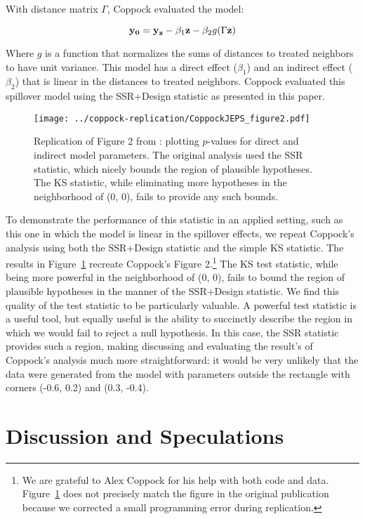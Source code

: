 With distance matrix $\Gamma$, Coppock evaluated the model:

$$\mathbf{y}_{\mathbf{0}} = \mathbf{y}_{\mathbf{z}} - \beta_1 \mathbf{z} - \beta_2 g(\Gamma \mathbf{z})$$

Where $g$ is a function that normalizes the sums of distances to treated
neighbors to have unit variance. This model has a direct
effect ($\beta_1$) and an indirect effect ($\beta_2$) that is linear in the distances to
treated neighbors. Coppock evaluated this spillover model using the SSR+Design statistic as
presented in this paper.

\begin{figure}[H] \centering
  \texttt{[image: ../coppock-replication/CoppockJEPS\_figure2.pdf]}
  \caption{Replication of Figure 2 from \citet{coppock2014information}: plotting
    $p$-values for direct and indirect model parameters. The
    original analysis used the SSR statistic, which nicely bounds the region of
    plausible hypotheses. The KS statistic, while eliminating more hypotheses in
  the neighborhood of (0, 0), fails to provide any such bounds.}\label{fig:coppock-replication}
\end{figure}


To demonstrate the performance of this statistic in
an applied setting, such as this one in which  the model is linear in the spillover effects, we repeat
Coppock's analysis using both the SSR+Design statistic and the simple KS statistic. The
results in Figure~\ref{fig:coppock-replication} recreate Coppock's Figure
2.\footnote{We are grateful to Alex Coppock for his help with both code and
  data. Figure~\ref{fig:coppock-replication} does not precisely match the
  figure in the original publication because we corrected a small
  programming error during replication.}
 The KS test statistic, while being more powerful in the neighborhood of (0,
0), fails to bound the region of plausible hypotheses in the manner of the
SSR+Design statistic. We find this quality of the test statistic to be
particularly valuable. A powerful test statistic is a useful
tool, but equally useful is the ability to succinctly describe the region in
which we would fail to reject a null hypothesis. In this case, the SSR statistic
provides such a region, making discussing and evaluating the result's
of Coppock's analysis much more straightforward: it would be very unlikely that
the data were generated from the model with parameters outside the rectangle
with corners (-0.6, 0.2) and (0.3, -0.4).

\section{Discussion and Speculations}

